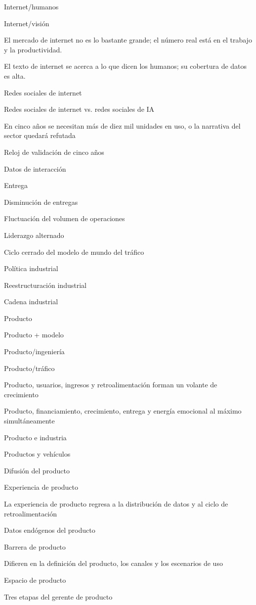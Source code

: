 \documentclass{article}
\begin{document}
Internet/humanos

Internet/visión

El mercado de internet no es lo bastante grande; el número real está en el trabajo y la productividad.

El texto de internet se acerca a lo que dicen los humanos; su cobertura de datos es alta.

Redes sociales de internet

Redes sociales de internet vs. redes sociales de IA

En cinco años se necesitan más de diez mil unidades en uso, o la narrativa del sector quedará refutada

Reloj de validación de cinco años

Datos de interacción

Entrega

Disminución de entregas

Fluctuación del volumen de operaciones

Liderazgo alternado

Ciclo cerrado del modelo de mundo del tráfico

Política industrial

Reestructuración industrial

Cadena industrial

Producto

Producto + modelo

Producto/ingeniería

Producto/tráfico

Producto, usuarios, ingresos y retroalimentación forman un volante de crecimiento

Producto, financiamiento, crecimiento, entrega y energía emocional al máximo simultáneamente

Producto e industria

Productos y vehículos

Difusión del producto

Experiencia de producto

La experiencia de producto regresa a la distribución de datos y al ciclo de retroalimentación

Datos endógenos del producto

Barrera de producto

Difieren en la definición del producto, los canales y los escenarios de uso

Espacio de producto

Tres etapas del gerente de producto
\end{document}
